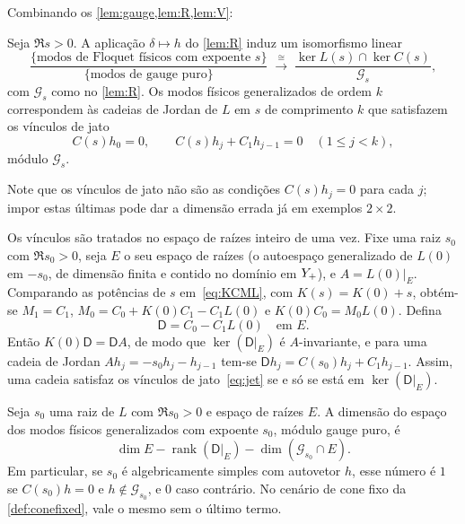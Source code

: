 Combinando os \cref{lem:gauge,lem:R,lem:V}:

\begin{theorem}[Correspondência]\label{thm:correspondence}
Seja $\Re s>0$. A aplicação $\delta\mapsto h$ do \cref{lem:R} induz um isomorfismo linear
\[
  \frac{\{\text{modos de Floquet físicos com expoente }s\}}{\{\text{modos de gauge puro}\}}
  \;\xrightarrow{\ \cong\ }\;
  \frac{\ker L(s)\cap\ker C(s)}{\mathcal G_s},
\]
com $\mathcal G_s$ como no \cref{lem:R}. Os modos físicos generalizados de ordem $k$ correspondem às cadeias de Jordan de
$L$ em $s$ de comprimento $k$ que satisfazem os vínculos de jato
\begin{equation}\label{eq:jet}
  C(s)h_0=0,\qquad C(s)h_j+C_1h_{j-1}=0\quad(1\le j<k),
\end{equation}
módulo $\mathcal G_s$.
\end{theorem}

Note que os vínculos de jato não são as condições $C(s)h_j=0$ para cada $j$; impor estas últimas pode
dar a dimensão errada já em exemplos $2\times2$.

Os vínculos são tratados no espaço de raízes inteiro de uma vez. Fixe uma raiz $s_0$ com $\Re s_0>0$, seja $E$ o seu
espaço de raízes (o autoespaço generalizado de $L(0)$ em $-s_0$, de dimensão finita e contido no domínio em
$Y_{+}$), e $A=L(0)|_E$. Comparando as potências de $s$ em~\eqref{eq:KCML}, com $K(s)=K(0)+s$, obtém-se $M_1=C_1$,
$M_0=C_0+K(0)C_1-C_1L(0)$ e $K(0)C_0=M_0L(0)$. Defina
\[
  \mathsf D=C_0-C_1L(0)\quad\text{em }E .
\]
Então $K(0)\mathsf D=\mathsf DA$, de modo que $\ker(\mathsf D|_E)$ é $A$-invariante, e para uma cadeia de Jordan
$Ah_j=-s_0h_j-h_{j-1}$ tem-se $\mathsf Dh_j=C(s_0)h_j+C_1h_{j-1}$. Assim, uma cadeia satisfaz os vínculos de
jato~\eqref{eq:jet} se e só se está em $\ker(\mathsf D|_E)$.

\begin{proposition}\label{prop:physmult}
Seja $s_0$ uma raiz de $L$ com $\Re s_0>0$ e espaço de raízes $E$. A dimensão do espaço dos modos físicos
generalizados com expoente $s_0$, módulo gauge puro, é
\[
  \dim E-\operatorname{rank}(\mathsf D|_E)-\dim(\mathcal G_{s_0}\cap E).
\]
Em particular, se $s_0$ é algebricamente simples com autovetor $h$, esse número é $1$ se $C(s_0)h=0$ e
$h\notin\mathcal G_{s_0}$, e $0$ caso contrário. No cenário de cone fixo da \cref{def:conefixed}, vale o mesmo sem o último
termo.
\end{proposition}

